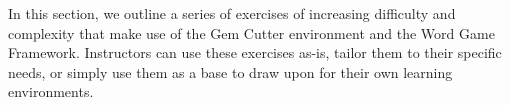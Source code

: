 
\label{chapter:Exercises}

In this section, we outline a series of exercises of increasing difficulty and complexity that make use of the Gem Cutter environment and the Word Game Framework.  Instructors can use these exercises as-is, tailor them to their specific needs, or simply use them as a base to draw upon for their own learning environments.



	


